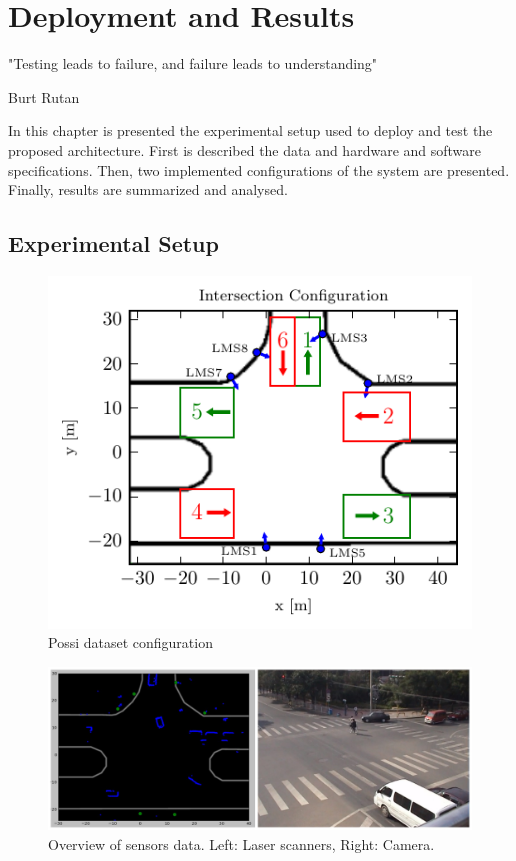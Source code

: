 \chapter [Deployment and Results]{Deployment and Results}

\epigraph{"Testing leads to failure, and failure leads to understanding"}{Burt Rutan}

In this chapter is presented the experimental setup used to deploy and test the proposed architecture. First is described the data and hardware and software specifications. Then, two implemented configurations of the system are presented. Finally, results are summarized and analysed.

\section{Experimental Setup}
\begin{figure}[ht!]
\centering
\includegraphics[scale=0.8]{fig/4/intersection-config2.pdf}
\caption{Possi dataset configuration}
\label{possi_img}
\end{figure}

\begin{figure}[ht!]
\centering
\includegraphics[scale=0.2]{fig/4/sensors_overview.jpeg}
\caption{Overview of sensors data. Left: Laser scanners, Right: Camera.}
\label{possi_sensors}
\end{figure}

